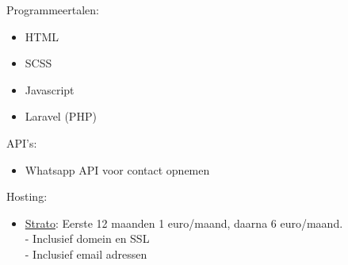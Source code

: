 \documentclass{article}
\begin{document}
Programmeertalen:
\begin{itemize}
    \item HTML
    \item SCSS
    \item Javascript
    \item Laravel (PHP)
\end{itemize}

API's:
\begin{itemize}
    \item Whatsapp API voor contact opnemen
\end{itemize}

Hosting:
\begin{itemize}
    \item \hyperlink{https://strato.nl}{Strato}: Eerste 12 maanden 1 euro/maand, daarna 6 euro/maand. \\
    - Inclusief domein en SSL \\
    - Inclusief email adressen
\end{itemize}
\end{document}
